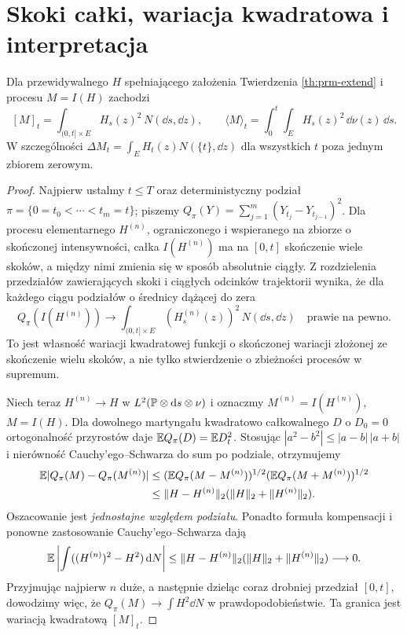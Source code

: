 \section{Skoki całki, wariacja kwadratowa i interpretacja}

\begin{twierdzenie}
\label{th:prm-bracket}
Dla przewidywalnego $H$ spełniającego założenia
Twierdzenia \ref{th:prm-extend} i procesu $M=I(H)$ zachodzi
\[
[M]_t=\int_{(0,t]\times E}H_s(z)^2\,N(\dd s,\dd z),
\qquad
\langle M\rangle_t=\int_0^t\int_EH_s(z)^2\,\dd\nu(z)\,\dd s.
\tag{11.3}\label{eq:prm-brackets}
\]
W szczególności $\Delta M_t=\int_EH_t(z)N(\{t\},\dd z)$
dla wszystkich $t$ poza jednym zbiorem zerowym.
\end{twierdzenie}
\begin{proof}
Najpierw ustalmy $t\le T$ oraz deterministyczny podział
$\pi=\{0=t_0<\cdots<t_m=t\}$; piszemy
$Q_\pi(Y)=\sum_{j=1}^m(Y_{t_j}-Y_{t_{j-1}})^2$.
Dla procesu elementarnego $H^{(n)}$, ograniczonego i
wspieranego na zbiorze o skończonej intensywności, całka
$I(H^{(n)})$ ma na $[0,t]$ skończenie wiele skoków, a między
nimi zmienia się w sposób absolutnie ciągły. Z rozdzielenia
przedziałów zawierających skoki i ciągłych odcinków trajektorii
wynika, że dla każdego ciągu podziałów o średnicy dążącej do zera
\[
 Q_\pi(I(H^{(n)}))\longrightarrow
 \int_{(0,t]\times E}(H_s^{(n)}(z))^2\,N(\dd s,\dd z)
 \quad\text{prawie na pewno}.
\]
To jest własność wariacji kwadratowej funkcji o skończonej
wariacji złożonej ze skończenie wielu skoków, a nie tylko
stwierdzenie o zbieżności procesów w supremum.

Niech teraz $H^{(n)}\to H$ w
$L^2(\mathbb{P}\otimes\mathrm{d} s\otimes\nu)$ i oznaczmy
$M^{(n)}=I(H^{(n)})$, $M=I(H)$. Dla dowolnego martyngału
kwadratowo całkowalnego $D$ o $D_0=0$ ortogonalność
przyrostów daje
$\mathbb{E} Q_\pi(D)=\mathbb{E} D_t^2$. Stosując
$|a^2-b^2|\le |a-b|\,|a+b|$ i nierówność
Cauchy'ego--Schwarza do sum po podziale, otrzymujemy
\[
\begin{split}
\mathbb{E}|Q_\pi(M)-Q_\pi(M^{(n)})|
&\le (\mathbb{E} Q_\pi(M-M^{(n)}))^{1/2}
      (\mathbb{E} Q_\pi(M+M^{(n)}))^{1/2}\\
&\le \lVert H-H^{(n)}\rVert_2
      (\lVert H\rVert_2+\lVert H^{(n)}\rVert_2).
\end{split}
\]
Oszacowanie jest \emph{jednostajne względem podziału}.
Ponadto formuła kompensacji i ponowne zastosowanie
Cauchy'ego--Schwarza dają
\[
\mathbb{E}\left|\int ((H^{(n)})^2-H^2)\,\mathrm{d} N\right|
\le\lVert H-H^{(n)}\rVert_2
  (\lVert H\rVert_2+\lVert H^{(n)}\rVert_2)\longrightarrow0.
\]
Przyjmując najpierw $n$ duże, a następnie dzieląc coraz
drobniej przedział $[0,t]$, dowodzimy więc, że
$Q_\pi(M)\to\int H^2\dd N$ w prawdopodobieństwie.
Ta granica jest wariacją kwadratową $[M]_t$.


\end{proof}
